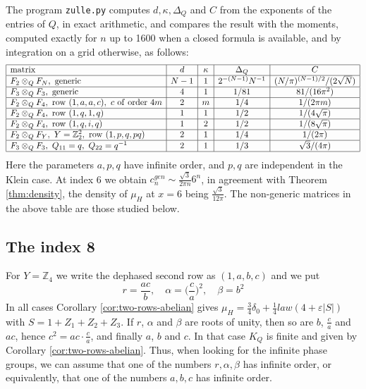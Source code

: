 \documentclass[11pt,reqno]{amsart}
\theoremstyle{definition}
\numberwithin{equation}{section}
\begin{document}
The program \texttt{zulle.py} computes $d,\kappa,\Delta_Q$ and $C$ from the exponents of the entries of $Q$, in exact arithmetic, and compares the result with the moments, computed exactly for $n$ up to 1600 when a closed formula is available, and by integration on a grid otherwise, as follows:
$$\begin{array}{|l|c|c|c|c|}\hline
{\rm matrix}&d&\kappa&\Delta_Q&C\\\hline
F_2\otimes_QF_N,\ {\rm generic}&N-1&1&2^{-(N-1)}N^{-1}&(N/\pi)^{(N-1)/2}/(2\sqrt N)\\\hline
F_3\otimes_QF_3,\ {\rm generic}&4&1&1/81&81/(16\pi^2)\\\hline
F_2\otimes_QF_4,\ {\rm row}\ (1,a,a,c),\ c\ {\rm of\ order}\ 4m&2&m&1/4&1/(2\pi m)\\\hline
F_2\otimes_QF_4,\ {\rm row}\ (1,q,1,q)&1&1&1/2&1/(4\sqrt\pi)\\\hline
F_2\otimes_QF_4,\ {\rm row}\ (1,q,i,q)&1&2&1/2&1/(8\sqrt\pi)\\\hline
F_2\otimes_QF_Y,\ Y=\mathbb Z_2^2,\ {\rm row}\ (1,p,q,pq)&2&1&1/4&1/(2\pi)\\\hline
F_3\otimes_QF_3,\ Q_{11}=q,\ Q_{22}=q^{-1}&2&1&1/3&\sqrt3/(4\pi)\\\hline
\end{array}$$
Here the parameters $a,p,q$ have infinite order, and $p,q$ are independent in the Klein case. At index 6 we obtain $c_n^{gen}\sim\frac{\sqrt3}{2\pi n}6^n$, in agreement with Theorem \ref{thm:density}, the density of $\mu_H$ at $x=6$ being $\frac{\sqrt3}{12\pi}$. The non-generic matrices in the above table are those studied below.

\subsection{The index 8}

For $Y=\mathbb Z_4$ we write the dephased second row as $(1,a,b,c)$ and we put
$$r=\frac{ac}b,\quad \alpha=\Big(\frac ca\Big)^2,\quad \beta=b^2$$
In all cases Corollary \ref{cor:two-rows-abelian} gives $\mu_H=\frac34\delta_0+\frac14 law(4+\varepsilon|S|)$ with $S=1+Z_1+Z_2+Z_3$. If $r$, $\alpha$ and $\beta$ are roots of unity, then so are $b$, $\frac ca$ and $ac$, hence $c^2=ac\cdot\frac ca$, and finally $a$, $b$ and $c$. In that case $K_Q$ is finite and given by Corollary \ref{cor:two-rows-abelian}. Thus, when looking for the infinite phase groups, we can assume that one of the numbers $r,\alpha,\beta$ has infinite order, or equivalently, that one of the numbers $a,b,c$ has infinite order.
\end{document}
